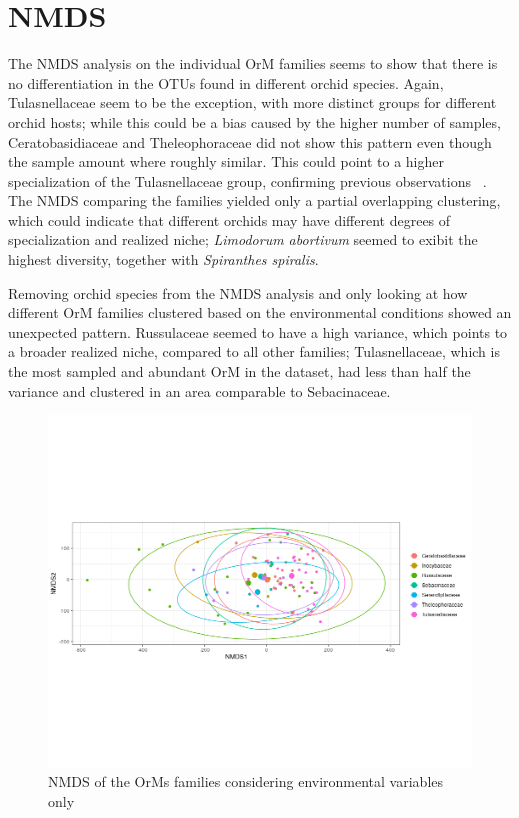 \chapter{NMDS}
\label{nmds}

The NMDS analysis on the individual OrM families seems to show that there is no differentiation in the OTUs found in different orchid species.
Again, Tulasnellaceae seem to be the exception, with more distinct groups for different orchid hosts; while this could be a bias caused by the higher number of samples, Ceratobasidiaceae and Theleophoraceae did not show this pattern even though the sample amount where roughly similar. This could point to a higher specialization of the Tulasnellaceae group, confirming previous observations ~\citep{dearnaley2007}.
The NMDS comparing the families yielded only a partial overlapping clustering, which could indicate that different orchids may have different degrees of specialization and realized niche; \emph{Limodorum abortivum} seemed to exibit the highest diversity, together with \emph{Spiranthes spiralis}.

Removing orchid species from the NMDS analysis and only looking at how different OrM families clustered based on the environmental conditions showed an unexpected pattern. Russulaceae seemed to have a high variance, which points to a broader realized niche, compared to all other families; Tulasnellaceae, which is the most sampled and abundant OrM in the dataset, had less than half the variance and clustered in an area comparable to Sebacinaceae.

\begin{figure}[htbp]
\centering
\includegraphics[keepaspectratio,width=\textwidth,height=0.75\textheight]{images/nmdsEnvMatrix.png}
\caption{NMDS of the OrMs families considering environmental variables only}
\end{figure}

